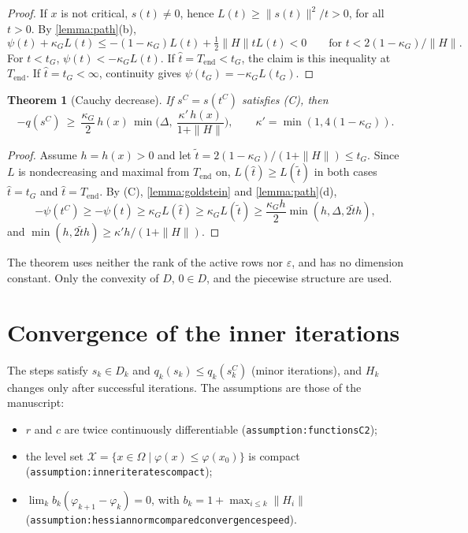 \documentclass[11pt,a4paper]{article}
\numberwithin{equation}{section}
\theoremstyle{plain}
\newtheorem{theorem}{Theorem}
\newtheorem{lemma}[theorem]{Lemma}
\theoremstyle{definition}
\theoremstyle{remark}
\newcommand{\Tend}{T_{\mathrm{end}}}
\newcommand{\kG}{\kappa_G}
\newcommand{\calX}{\mathcal{X}}
\newcommand{\codeus}{\textunderscore\allowbreak}
\newcommand{\code}[1]{{\let\_\codeus\texttt{#1}}}
\begin{document}

\begin{proof}
If $x$ is not critical, $s(t)\ne0$, hence $L(t)\ge\|s(t)\|^2/t>0$, for all $t>0$. By
\cref{lemma:path}(b),
\[
  \psi(t)+\kG L(t)\le-(1-\kG)L(t)+\tfrac12\|H\|tL(t)<0
  \qquad\text{for } t<2(1-\kG)/\|H\|.
\]
For $t<t_G$, $\psi(t)<-\kG L(t)$. If $\hat t=\Tend<t_G$, the claim is this inequality at
$\Tend$. If $\hat t=t_G<\infty$, continuity gives $\psi(t_G)=-\kG L(t_G)$.
\end{proof}

\begin{theorem}[Cauchy decrease]\label{theo:cauchy_decrease}
If $s^C=s(t^C)$ satisfies (C), then
\[
  -q(s^C)\ \ge\ \frac{\kG}{2}\,h(x)\,\min\Big(\Delta,\ \frac{\kappa'\,h(x)}{1+\|H\|}\Big),
  \qquad\kappa'=\min(1,4(1-\kG)).
\]
\end{theorem}

\begin{proof}
Assume $h=h(x)>0$ and let $\tilde t=2(1-\kG)/(1+\|H\|)\le t_G$. Since $L$ is nondecreasing and
maximal from $\Tend$ on, $L(\hat t)\ge L(\tilde t)$ in both cases $\hat t=t_G$ and
$\hat t=\Tend$. By (C), \cref{lemma:goldstein} and \cref{lemma:path}(d),
\[
  -\psi(t^C)\ge-\psi(\hat t)\ge\kG L(\hat t)\ge\kG L(\tilde t)
  \ge\frac{\kG h}{2}\min(h,\Delta,2\tilde th),
\]
and $\min(h,2\tilde th)\ge\kappa'h/(1+\|H\|)$.
\end{proof}

The theorem uses neither the rank of the active rows nor $\varepsilon$, and has no dimension
constant. Only the convexity of $D$, $0\in D$, and the piecewise structure are used.

\section{Convergence of the inner iterations}\label{sec:convergence}

The steps satisfy $s_k\in D_k$ and $q_k(s_k)\le q_k(s_k^C)$ (minor iterations), and $H_k$
changes only after successful iterations. The assumptions are those of the manuscript:
\begin{itemize}
\item $r$ and $c$ are twice continuously differentiable (\code{assumption:\allowbreak functions\_C2});
\item the level set $\calX=\{x\in\Omega\mid\varphi(x)\le\varphi(x_0)\}$ is compact
  (\code{assumption:\allowbreak inner\_iterates\_compact});
\item $\lim_k b_k(\varphi_{k+1}-\varphi_k)=0$, with $b_k=1+\max_{i\le k}\|H_i\|$
  (\code{assumption:\allowbreak hessian\_norm\_compared\_convergence\_speed}).
\end{itemize}
\end{document}
